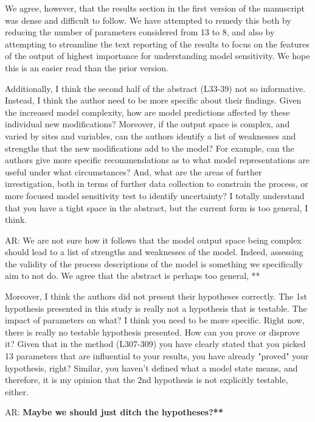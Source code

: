 \documentclass{article}
\begin{document}
{{{We agree, however, that the results section in the first version of the manuscript was dense and difficult to follow. We have attempted to remedy this both by reducing the number of parameters considered from 13 to 8, and also by attempting to streamline the text reporting of the results to focus on the features of the output of highest importance for understanding model sensitivity. We hope this is an easier read than the prior version. 
} 



Additionally, I think the second half of the abstract (L33-39) not so informative. Instead, I think the author need to be more specific about their findings. Given the increased model complexity, how are model predictions affected by these individual new modifications? Moreover, if the output space is complex, and varied by sites and variables, can the authors identify a list of weaknesses and strengths that the new modifications add to the model? For example, can the authors give more specific recommendations as to what model representations are useful under what circumstances? And, what are the areas of further investigation, both in terms of further data collection to constrain the process, or more focused model sensitivity test to identify uncertainty? I totally understand that you have a tight space in the abstract, but the current form is too general, I think. 

\textsf{AR: We are not sure how it follows that the model output space being complex should lead to a list of strengths and weaknesses of the model. Indeed, assessing the validity of the process descriptions of the model is something we specifically aim to not do. We agree that the abstract is perhaps too general, **}}

Moreover, I think the authors did not present their hypotheses correctly. The 1st hypothesis presented in this study is really not a hypothesis that is testable. The impact of parameters on what? I think you need to be more specific. Right now, there is really no testable hypothesis presented. How can you prove or disprove it? Given that in the method (L307-309) you have clearly stated that you picked 13 parameters that are influential to your results, you have already "proved" your hypothesis, right? Similar, you haven't defined what a model state means, and therefore, it is my opinion that the 2nd hypothesis is not explicitly testable, either. 

\textsf{AR: \textbf{Maybe we should just ditch the hypotheses?** }}

}
\end{document}
